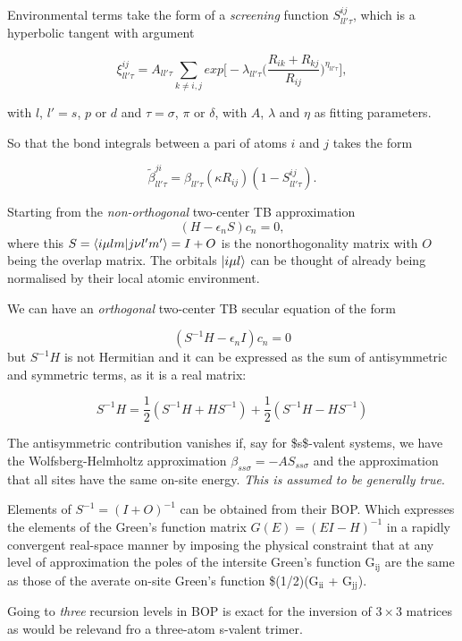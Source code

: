\documentclass[11pt]{article}
\begin{document}
\begin{enumerate}
Environmental terms take the form of a \emph{screening} function \(S^{ij}_{ll'\tau}\),
which is a hyperbolic tangent with argument 

\begin{equation}
\xi^{ij}_{ll'\tau} = A_{ll'\tau} \sum_{k \neq i,j} exp \Big[
    - \lambda_{ll'\tau} \Big( 
              \frac{R_{ik} + R_{kj}}{R_{ij}} \Big)^{\eta_{ll'\tau}} \Big],
\end{equation}

with \(l\), \(l' = s\), \(p\) or \(d\) and \(\tau = \sigma\), \(\pi\) or \(\delta\), with
\(A\), \(\lambda\) and \(\eta\) as fitting parameters. 

So that the bond integrals between a pari of atoms \(i\) and \(j\) takes the form 

\[
\widetilde{\beta}^{ji}_{ll'\tau} = \beta_{ll'\tau}(\kappa R_{ij}) ( 1 - S^{ij}_{ll'\tau}).
\]

Starting from the \emph{non-orthogonal} two-center TB approximation 
\[
( H - \epsilon_{n} S  )c_{n} = 0,
\]
where this \(S = \bra{i\mu lm}\ket{j\nu l'm'} = I + O\) is the nonorthogonality matrix with \(O\) being the
overlap matrix. The orbitals \(\ket{i\mu l}\) can be thought of already being
normalised by their local atomic environment. 

We can have an \emph{orthogonal} two-center TB secular equation of the form 

\[
(S^{-1}H - \epsilon_{n}I)c_{n} = 0
\]
but \(S^{-1}H\) is not Hermitian and it can be expressed as the sum of
antisymmetric and symmetric terms, as it is a real matrix:

\[
S^{-1}H = \frac{1}{2} ( S^{-1}H + HS^{-1}) + \frac{1}{2}( S^{-1}H - HS^{-1})
\]

The antisymmetric contribution vanishes if, say for \$s\$-valent systems, we have the
Wolfsberg-Helmholtz approximation \(\beta_{ss\sigma} = -AS_{ss\sigma}\) and the
approximation that all sites have the same on-site energy. 
\emph{This is assumed to be generally true}.


Elements of \(S^{-1} =  (I + O)^{-1}\) can be obtained from their BOP. Which
expresses the elements of the Green's function matrix \(G(E) = (EI - H)^{-1}\)
in a rapidly convergent real-space manner by imposing the physical constraint
that at any level of approximation the poles of the intersite Green's function
G\(_{\text{ij}}\) are the same as those of the averate on-site Green's function
\$(1/2)(G\(_{\text{ii}}\) + G\(_{\text{jj}}\)). 


Going to \emph{three} recursion levels in BOP is exact for the inversion of
\(3\times 3\) matrices as would be relevand fro a three-atom s-valent trimer. 


\end{enumerate}
\end{document}
